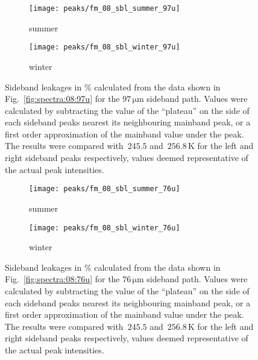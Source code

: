 \begin{figure}[ht]
    \centering
    \begin{subfigure}[b]{0.9545\textwidth}
        \texttt{[image: peaks/fm\_08\_sbl\_summer\_97u]}
        \caption{summer}\label{fig:sbl:08:summer:97u}
    \end{subfigure}
    \begin{subfigure}[b]{0.9545\textwidth}
        \texttt{[image: peaks/fm\_08\_sbl\_winter\_97u]}
        \caption{winter}\label{fig:sbl:08:winter:97u}
    \end{subfigure}
    \caption{Sideband leakages in \% calculated from the data shown in
        Fig.~\ref{fig:spectra:08:97u} for the $97\,\mathrm{\mu m}$ sideband
        path.  Values were calculated by subtracting the value of the
        ``plateau'' on the side of each sideband peaks nearest its
        neighbouring mainband peak, or a first order approximation of the
        mainband value under the peak.  The results were compared with~$245.5$
        and~$256.8\,\mathrm{K}$ for the left and right sideband peaks
        respectively, values deemed representative of the actual peak
        intensities.
        }\label{fig:sbl:08:97u}
\end{figure}

\begin{figure}[ht]
    \centering
    \begin{subfigure}[b]{0.9545\textwidth}
        \texttt{[image: peaks/fm\_08\_sbl\_summer\_76u]}
        \caption{summer}\label{fig:sbl:08:summer:76u}
    \end{subfigure}
    \begin{subfigure}[b]{0.9545\textwidth}
        \texttt{[image: peaks/fm\_08\_sbl\_winter\_76u]}
        \caption{winter}\label{fig:sbl:08:winter:76u}
    \end{subfigure}
    \caption{Sideband leakages in \% calculated from the data shown in
        Fig.~\ref{fig:spectra:08:76u} for the $76\,\mathrm{\mu m}$ sideband
        path.  Values were calculated by subtracting the value of the
        ``plateau'' on the side of each sideband peaks nearest its
        neighbouring mainband peak, or a first order approximation of the
        mainband value under the peak.  The results were compared with~$245.5$
        and~$256.8\,\mathrm{K}$ for the left and right sideband peaks
        respectively, values deemed representative of the actual peak
        intensities.
        }\label{fig:sbl:08:76u}
\end{figure}

